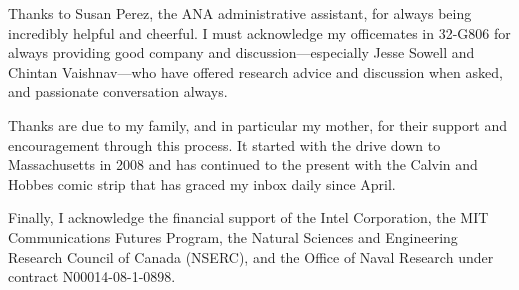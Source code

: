 Thanks to Susan Perez, the ANA administrative assistant, for always being
incredibly helpful and cheerful. I must acknowledge my officemates in 32-G806
for always providing good company and discussion---especially Jesse Sowell and
Chintan Vaishnav---who have offered research advice and discussion when
asked, and passionate conversation always.

Thanks are due to my family, and in particular my mother, for their support and
encouragement through this process. It started with the drive down to
Massachusetts in 2008 and has continued to the present with the Calvin and
Hobbes comic strip that has graced my inbox daily since April.

Finally, I acknowledge the financial support of the Intel Corporation, the MIT
Communications Futures Program, the Natural Sciences and Engineering Research
Council of Canada (NSERC), and the Office of Naval Research under contract
N00014-08-1-0898.

%
%
%
%
